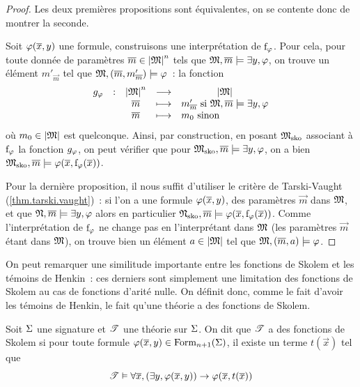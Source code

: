 \begin{proof}
  Les deux premières propositions sont équivalentes, on se contente donc de
  montrer la seconde.

  Soit $\varphi(\overline{x},y)$ une formule, construisons une interprétation de
  $\mathrm{f}_{\varphi}$. Pour cela, pour toute donnée de paramètres
  $\overline{m}\in\left\vert \mathfrak{M}\right\vert^n$ tels que $\mathfrak{M},\overline{m}\models\exists y,\varphi$, on
  trouve un élément $m'_{\vec m}$ tel que
  $\mathfrak{M},(\overline{m},m'_{\overline{m}})\models\varphi$~: la fonction
  \[\makeFunBis{g_{\varFF}}
               {\carMM^n}{\carMM}
               {\vec m}
               {m'_{\vec m} \text{ si } \varMM,\vec m\satisf\exists y,\varFF}
               {\vec m}
               {m_0\text { sinon}}\]
  où $m_0\in\left\vert \mathfrak{M}\right\vert$ est quelconque. Ainsi, par construction, en posant
  $\mathfrak{M}_{\operatorname{sko}}$ associant à $\mathrm{f}_{\varphi}$ la fonction $g_{\varphi}$, on
  peut vérifier que pour $\mathfrak{M}_{\operatorname{sko}},\overline{m}\models\exists y,\varphi$, on a
  bien $\mathfrak{M}_{\operatorname{sko}},\overline{m}\models\varphi(\overline{x},\mathrm{f}_{\varphi}(\overline{x}))$.

  Pour la dernière proposition, il nous suffit d'utiliser le critère de
  Tarski-Vaught (\cref{thm.tarski.vaught})~: si l'on a une formule
  $\varphi(\overline{x},y)$, des paramètres $\vec m$ dans $\mathfrak{M}$, et que
  $\mathfrak{N},\overline{m}\models\exists y,\varphi$ alors en particulier
  $\mathfrak{N}_{\operatorname{sko}},\overline{m}\models \varphi(\overline{x},\mathrm{f}_{\varphi}(\overline{x}))$.
  Comme l'interprétation de $\mathrm{f}_{\varphi}$ ne change pas en l'interprétant
  dans $\mathfrak{M}$ (les paramètres $\vec m$ étant dans $\mathfrak{M}$), on trouve bien
  un élément $a \in \left\vert \mathfrak{M}\right\vert$ tel que $\mathfrak{M},(\overline{m},a)\models\varphi$.
\end{proof}

On peut remarquer une similitude importante entre les fonctions de Skolem et les
témoins de Henkin~: ces derniers sont simplement une limitation des fonctions de
Skolem au cas de fonctions d'arité nulle. On définit donc, comme le fait d'avoir
les témoins de Henkin, le fait qu'une théorie a des fonctions de Skolem.

\begin{definition}
  Soit $\Sigma$ une signature et $\mathscr T$ une théorie sur $\Sigma$. On dit que
  $\mathscr T$ a des fonctions de Skolem si pour toute formule
  $\varphi(\overline{x},y)\in\operatorname{Form}_{n+1}(\Sigma)$, il existe un terme
  $t(\vec x)$ tel que
  \[\mathscr T\vDash\forall \overline{x}, (\exists y,\varphi(\overline{x},y))\to
  \varphi(\overline{x},t(\overline{x}))\]
\end{definition}


